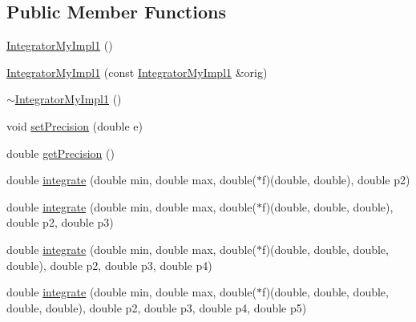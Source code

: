 \subsection*{Public Member Functions}
\begin{DoxyCompactItemize}
\item 
\hyperlink{class_integrator_my_impl1_a1d1b8df78549b530f99b88d6a83e85b0}{Integrator\-My\-Impl1} ()
\item 
\hyperlink{class_integrator_my_impl1_a1cf39ec6d11720cc9965a0b04495080b}{Integrator\-My\-Impl1} (const \hyperlink{class_integrator_my_impl1}{Integrator\-My\-Impl1} \&orig)
\item 
\hyperlink{class_integrator_my_impl1_a483165ecb54e8cf6c43e2972f0ab07b4}{$\sim$\-Integrator\-My\-Impl1} ()
\item 
void \hyperlink{class_integrator_my_impl1_a74ca07f81a587332dab9aee756063c43}{set\-Precision} (double e)
\item 
double \hyperlink{class_integrator_my_impl1_aea9d2dd973771048d4468af0ff8ec0d7}{get\-Precision} ()
\item 
double \hyperlink{class_integrator_my_impl1_a0f5f36cb45c4d50832b1d9bc8bdfcf8b}{integrate} (double min, double max, double($\ast$f)(double, double), double p2)
\item 
double \hyperlink{class_integrator_my_impl1_a841ac12407f9c2941d37e753c3916236}{integrate} (double min, double max, double($\ast$f)(double, double, double), double p2, double p3)
\item 
double \hyperlink{class_integrator_my_impl1_a9bf5693a1c2eff13b04a54771bd4c9df}{integrate} (double min, double max, double($\ast$f)(double, double, double, double), double p2, double p3, double p4)
\item 
double \hyperlink{class_integrator_my_impl1_a5cff324672903d41acb47f852d1a5918}{integrate} (double min, double max, double($\ast$f)(double, double, double, double, double), double p2, double p3, double p4, double p5)
\end{DoxyCompactItemize}


